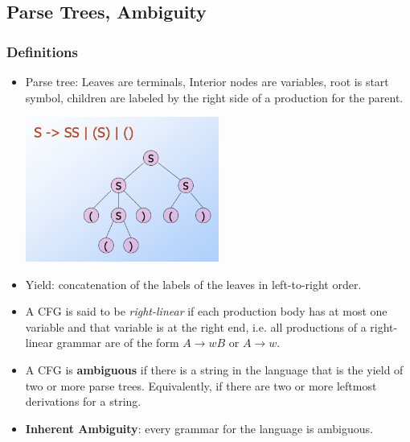 \subsection{\color{ForestGreen}Parse Trees, Ambiguity}
\subsubsection{Definitions}
\begin{itemize}
    \item Parse tree: Leaves are terminals, Interior nodes are variables, root is start symbol, children are labeled by the right side of a production for the parent.
    \begin{Figure}
        \includegraphics[width=0.5\textwidth]{figures/parsetree.png}
    \end{Figure}
    \item Yield: concatenation of the labels of the leaves in left-to-right order.
    \item A CFG is said to be \textit{right-linear} if each production body has at most one variable and that variable is at the right end, i.e. all productions of a {right-linear} grammar are of the form $A \rightarrow{}wB$ or $A\rightarrow{}w.$
    \item A CFG is \textbf{ambiguous} if there is a string in the language that is the yield of two or more parse trees. Equivalently, if there are two or more leftmost derivations for a string.  
    \item \textbf{Inherent Ambiguity}: every grammar for the language is ambiguous. 
\end{itemize}
